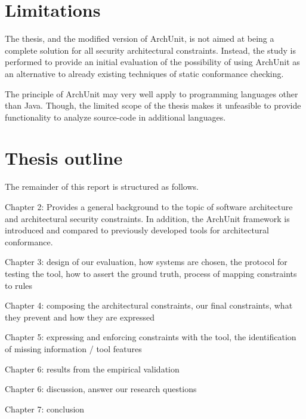 \section{Limitations}
\label{sec:limitations}

The thesis, and the modified version of ArchUnit, is not aimed at being a complete solution for all security architectural constraints. Instead, the study is performed to provide an initial evaluation of the possibility of using ArchUnit as an alternative to already existing techniques of static conformance checking. 

The principle of ArchUnit may very well apply to programming languages other than Java. Though, the limited scope of the thesis makes it unfeasible to provide functionality to analyze source-code in additional languages.

\section{Thesis outline}

The remainder of this report is structured as follows.

Chapter 2: Provides a general background to the topic of software architecture and architectural security constraints. In addition, the ArchUnit framework is introduced and compared to previously developed tools for architectural conformance.  

Chapter 3:
design of our evaluation,
how systems are chosen,
the protocol for testing the tool,
how to assert the ground truth,
process of mapping constraints to rules

Chapter 4:
composing the architectural constraints,
our final constraints, what they prevent and how they are expressed


Chapter 5:
expressing and enforcing constraints with the tool,
the identification of missing information / tool features

Chapter 6:
results from the empirical validation

Chapter 6:
discussion,
answer our research questions

Chapter 7:
conclusion